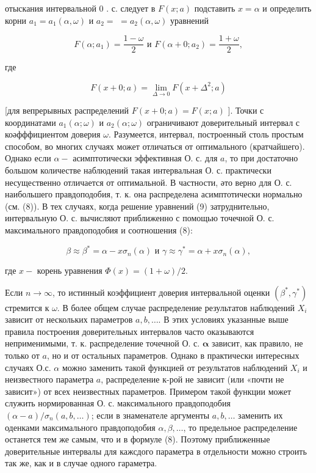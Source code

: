 \documentclass[10pt]{article}
\begin{document}
отыскания интервальной 0 . с. следует в $F(x ; a)$ подставить $x=\alpha$ и определить корни $a_{1}=a_{1}(\alpha, \omega)$ и $a_{2}=$ $=a_{2}(\alpha, \omega)$ уравнений

\[
F\left(\alpha ; a_{1}\right)=\frac{1-\omega}{2} \text { и } F\left(\alpha+0 ; a_{2}\right)=\frac{1+\omega}{2},
\]

где

\[
F(x+0 ; a)=\lim _{\Delta \rightarrow 0} F\left(x+\Delta^{2} ; a\right)
\]

[для вепрерывных распределений $F(x+0 ; a)=F(x ; a)$ ]. Точки с координатами $a_{1}(\alpha ; \omega)$ и $a_{2}(\alpha ; \omega)$ ограничивают доверительный интервал с коәфффициентом доверия $\omega$. Разумеется, интервал, построенный столь простым способом, во многих случаях может отличаться от оптимального (кратчайшего). Однако если $\alpha-$ асимптотически эффективная О. с. для $a$, то при достаточно большом количестве наблюдений такая интервальная О. с. практически несущественно отличается от оптимальной. В частности, әто верно для О. с. наибольшего правдоподобия, т. к. она распределена асимптотически нормально (см. (8)). В тех случаях, когда решение уравнений (9) затруднительно, интервальную О. с. вычисляют приближенно с помощью точечной О. с. максимального правдоподобия и соотношения (8):

\[
\beta \approx \beta^{*}=\alpha-x \sigma_{n}(\alpha) \text { и } \gamma \approx \gamma^{*}=\alpha+x \sigma_{n}(\alpha),
\]

где $x-$ корень уравнения $\Phi(x)=(1+\omega) / 2$.

Если $n \rightarrow \infty$, то истинный коэффициент доверия интервальной оценки $\left(\beta^{*}, \gamma^{*}\right)$ стремится к $\omega$. В более общем случае распределение результатов наблюдений $X_{i}$ зависит от нескольких параметров $a, b, \ldots$. В этих условиях указанные выше правила построения доверительных интервалов часто оказываются неприменимыми, т. к. распределение точечной О. с. $\boldsymbol{\alpha}$ зависит, как правило, не только от $a$, но и от остальных параметров. Однако в практически интересных случаях О.с. $\alpha$ можно заменить такой функцией от результатов наблюдений $X_{i}$ и неизвестного параметра $a$, распределение к-рой не зависит (или «почти не зависит») от всех неизвестных параметров. Примером такой функции может служить нормированная О. с. максимального правдоподобия $(\alpha-a) / \sigma_{n}(a, b, \ldots)$; если в знаменателе аргументы $a, b, \ldots$ заменить их оденками максимального правдоподобия $\alpha, \beta, \ldots$, то предельное распределение останется тем же самым, что и в формуле (8). Поэтому приближенные доверительные интервалы для кажсдого параметра в отдельности можно строить так же, как и в случае одного гараметра.
\end{document}
